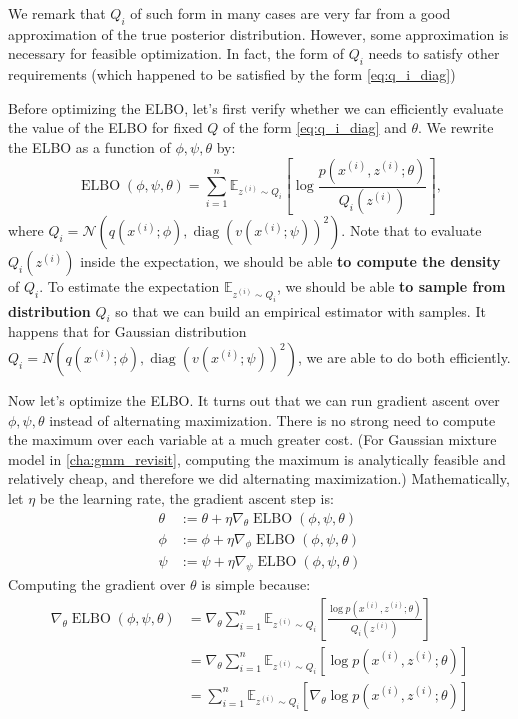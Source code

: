 We remark that $Q_i$ of such form in many cases are very far from a good
approximation of the true posterior distribution. However, some
approximation is necessary for feasible optimization. In fact, the form of $Q_i$ needs to
satisfy other requirements (which happened to be satisfied by the form \ref{eq:q_i_diag})

Before optimizing the ELBO, let's first verify whether we can efficiently
evaluate the value of the ELBO for fixed $Q$ of the form \ref{eq:q_i_diag} and $\theta$. We
rewrite the ELBO as a function of $\phi,\psi,\theta$ by:
\begin{equation}
    \operatorname{ELBO}(\phi,\psi,\theta) = \sum_{i=1}^n \mathbb E_{z^{(i)} \sim Q_i}\left[\log \frac{p(x^{(i)} ,z^{(i)} ;\theta)}{Q_i (z^{(i)})} \right],\label{eq:elbo_phi_psi_theta}
\end{equation}
where $Q_i = \mathcal N(q(x^{(i)} ;\phi),\operatorname{diag}(v(x^{(i)} ;\psi))^2)$.
Note that to evaluate $Q_i(z^{(i)})$ inside the expectation, we should be able \textbf{to
compute the density} of $Q_i$. To estimate the expectation $\mathbb E_{z^{(i)} \sim Q_i}$, we
should be able \textbf{to sample from distribution} $Q_i$ so that we can build an
empirical estimator with samples. It happens that for Gaussian distribution
$Q_i = N(q(x^{(i)} ;\phi),\operatorname{diag}(v(x^{(i)} ;\psi))^2)$, we are able to do both efficiently. %

Now let's optimize the ELBO. It turns out that we can run gradient
ascent over $\phi,\psi,\theta$ instead of alternating maximization. There is no strong
need to compute the maximum over each variable at a much greater cost. (For
Gaussian mixture model in \cref{cha:gmm_revisit}, computing the maximum is analytically
feasible and relatively cheap, and therefore we did alternating maximization.)
Mathematically, let $\eta$ be the learning rate, the gradient ascent step is:
\begin{align*}
    \theta &:= \theta + \eta\nabla_\theta \operatorname{ELBO}(\phi,\psi,\theta)\\
    \phi &:= \phi + \eta\nabla_\phi \operatorname{ELBO}(\phi,\psi,\theta)\\
    \psi &:= \psi + \eta\nabla_\psi \operatorname{ELBO}(\phi,\psi,\theta)
\end{align*}
Computing the gradient over $\theta$ is simple because:
\begin{align}
\nabla_\theta \operatorname{ELBO}(\phi,\psi,\theta) &= \nabla_\theta \sum_{i=1}^n \mathbb E_{z^{(i)} \sim Q_i} \left[ \frac{\log p(x^{(i)} ,z^{(i)} ;\theta)}{Q_i(z^{(i)})}\right]\\
    &= \nabla_\theta \sum_{i=1}^n \mathbb E_{z^{(i)} \sim Q_i} \left[ \log p(x^{(i)} ,z^{(i)} ;\theta) \right]\\
    &= \sum_{i=1}^n \mathbb E_{z^{(i)} \sim Q_i} \left[ \nabla_\theta \log p(x^{(i)} ,z^{(i)} ;\theta) \right]
\end{align}

